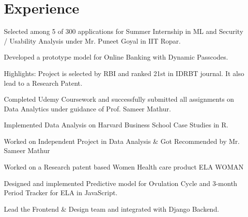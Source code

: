 \documentclass[]{deedy-resume-openfont}
\begin{document}
\begin{minipage}[t]{0.66\textwidth} 


\section{Experience}

\vspace{\topsep} %
\begin{tightemize}\item Selected among 5 of 300 applications for Summer Internship in ML and Security / Usability Analysis under Mr. Puneet Goyal in IIT Ropar.
\item Developed a prototype model for Online Banking with Dynamic Passcodes.
\item Highlights: Project is selected by RBI and ranked 21st in IDRBT journal. It also lead to a Research Patent.

\end{tightemize}
\sectionsep

\begin{tightemize}
\item Completed Udemy Coursework and successfully submitted all assignments on Data Analytics under guidance of Prof. Sameer Mathur.   
\item Implemented Data Analysis on Harvard Business School Case Studies in R.
\item Worked on Independent Project in Data Analysis \& Got Recommended by Mr. Sameer Mathur
\end{tightemize}
\sectionsep

\begin{tightemize}
\item Worked on a Research patent based Women Health care product ELA WOMAN\item Designed and implemented Predictive model for Ovulation Cycle and 3-month Period Tracker for ELA in JavaScript.\item Lead the Frontend \& Design team and integrated with Django Backend.\end{tightemize}
\sectionsep


\end{minipage}
\end{document}
